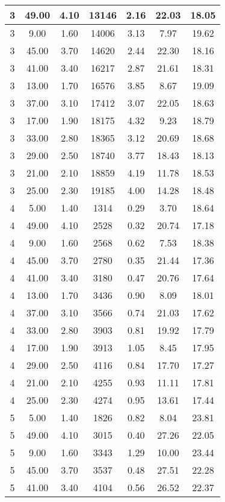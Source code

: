 \begin{tabular}{|c|c|c|c|c|c|c|}
\hline
3 & 49.00 & 4.10 & 13146 & 2.16 & 22.03 & 18.05\\
\hline
3 & 9.00 & 1.60 & 14006 & 3.13 & 7.97 & 19.62\\
\hline
3 & 45.00 & 3.70 & 14620 & 2.44 & 22.30 & 18.16\\
\hline
3 & 41.00 & 3.40 & 16217 & 2.87 & 21.61 & 18.31\\
\hline
3 & 13.00 & 1.70 & 16576 & 3.85 & 8.67 & 19.09\\
\hline
3 & 37.00 & 3.10 & 17412 & 3.07 & 22.05 & 18.63\\
\hline
3 & 17.00 & 1.90 & 18175 & 4.32 & 9.23 & 18.79\\
\hline
3 & 33.00 & 2.80 & 18365 & 3.12 & 20.69 & 18.68\\
\hline
3 & 29.00 & 2.50 & 18740 & 3.77 & 18.43 & 18.13\\
\hline
3 & 21.00 & 2.10 & 18859 & 4.19 & 11.78 & 18.53\\
\hline
3 & 25.00 & 2.30 & 19185 & 4.00 & 14.28 & 18.48\\
\hline
4 & 5.00 & 1.40 & 1314 & 0.29 & 3.70 & 18.64\\
\hline
4 & 49.00 & 4.10 & 2528 & 0.32 & 20.74 & 17.18\\
\hline
4 & 9.00 & 1.60 & 2568 & 0.62 & 7.53 & 18.38\\
\hline
4 & 45.00 & 3.70 & 2780 & 0.35 & 21.44 & 17.36\\
\hline
4 & 41.00 & 3.40 & 3180 & 0.47 & 20.76 & 17.64\\
\hline
4 & 13.00 & 1.70 & 3436 & 0.90 & 8.09 & 18.01\\
\hline
4 & 37.00 & 3.10 & 3566 & 0.74 & 21.03 & 17.62\\
\hline
4 & 33.00 & 2.80 & 3903 & 0.81 & 19.92 & 17.79\\
\hline
4 & 17.00 & 1.90 & 3913 & 1.05 & 8.45 & 17.95\\
\hline
4 & 29.00 & 2.50 & 4116 & 0.84 & 17.70 & 17.27\\
\hline
4 & 21.00 & 2.10 & 4255 & 0.93 & 11.11 & 17.81\\
\hline
4 & 25.00 & 2.30 & 4274 & 0.95 & 13.61 & 17.44\\
\hline
5 & 5.00 & 1.40 & 1826 & 0.82 & 8.04 & 23.81\\
\hline
5 & 49.00 & 4.10 & 3015 & 0.40 & 27.26 & 22.05\\
\hline
5 & 9.00 & 1.60 & 3343 & 1.29 & 10.00 & 23.44\\
\hline
5 & 45.00 & 3.70 & 3537 & 0.48 & 27.51 & 22.28\\
\hline
5 & 41.00 & 3.40 & 4104 & 0.56 & 26.52 & 22.37\\

\end{tabular}
